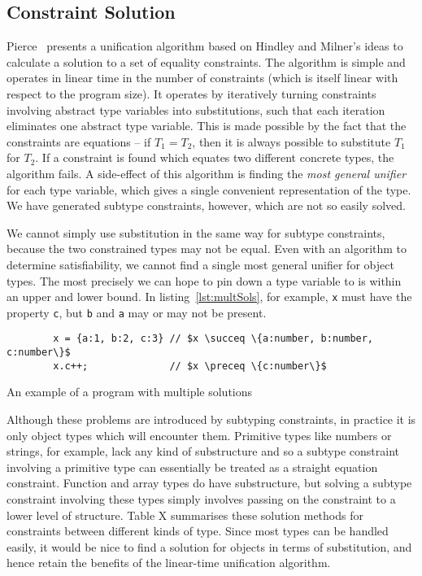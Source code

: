 \documentclass[12pt,a4paper,twoside,openright]{report}
\newcommand*{\js}{\texttt}
\begin{document}
\subsection{Constraint Solution}

Pierce~\cite{pierce} presents a unification algorithm based on Hindley and
Milner's ideas to calculate a solution to a set of equality constraints. The
algorithm is simple and operates in linear time in the number of constraints
(which is itself linear with respect to the program size). It operates by
iteratively turning constraints involving abstract type variables into
substitutions, such that each iteration eliminates one abstract type variable.
This is made possible by the fact that the constraints are equations -- if
$T_1=T_2$, then it is always possible to substitute $T_1$ for $T_2$. If a
constraint is found which equates two different concrete types, the algorithm
fails. A side-effect of this algorithm is finding the \textit{most general
  unifier} for each type variable, which gives a single convenient
representation of the type.  We have generated subtype constraints, however,
which are not so easily solved.

We cannot simply use substitution in the same way for subtype constraints,
because the two constrained types may not be equal. Even with an algorithm to
determine satisfiability, we cannot find a single most general unifier for
object types.  The most precisely we can hope to pin down a type variable to is
within an upper and lower bound.  In listing~\ref{lst:multSols}, for example,
\js{x} must have the property \js{c}, but \js{b} and \js{a} may or may not be
present.  

\begin{program}
  \begin{verbatim}
		x = {a:1, b:2, c:3} // $x \succeq \{a:number, b:number, c:number\}$
		x.c++;              // $x \preceq \{c:number\}$
  \end{verbatim}
  \caption{An example of a program with multiple solutions}\label{lst:multSols}
\end{program}

Although these problems are introduced by subtyping constraints, in practice it
is only object types which will encounter them. Primitive types like numbers or
strings, for example, lack any kind of substructure and so a subtype constraint
involving a primitive type can essentially be treated as a straight equation
constraint. Function and array types do have substructure, but solving a
subtype constraint involving these types simply involves passing on the
constraint to a lower level of structure. Table {\color{red}X} summarises these
solution methods for constraints between different kinds of type. Since most
types can be handled easily, it would be nice to find a solution for objects in
terms of substitution, and hence retain the benefits of the linear-time
unification algorithm. 
\end{document}
